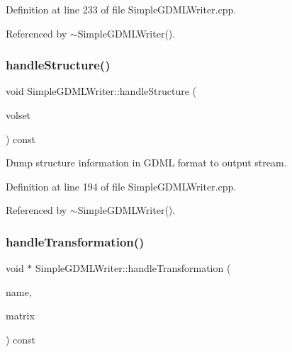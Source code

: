 Definition at line 233 of file Simple\+G\+D\+M\+L\+Writer.\+cpp.



Referenced by $\sim$\+Simple\+G\+D\+M\+L\+Writer().

\hypertarget{class_d_d4hep_1_1_geometry_1_1_simple_g_d_m_l_writer_a88417b920fda18350a8e8af662c48375}{}\label{class_d_d4hep_1_1_geometry_1_1_simple_g_d_m_l_writer_a88417b920fda18350a8e8af662c48375} 
\subsubsection{\texorpdfstring{handle\+Structure()}{handleStructure()}}
{\footnotesize\ttfamily void Simple\+G\+D\+M\+L\+Writer\+::handle\+Structure (\begin{DoxyParamCaption}\item[{const \hyperlink{class_d_d4hep_1_1_geometry_1_1_geo_handler_types_a6713619ef278692ebdf9f6ee4a3f32de}{Volume\+Vector} \&}]{volset }\end{DoxyParamCaption}) const\hspace{0.3cm}{\ttfamily [virtual]}}



Dump structure information in G\+D\+ML format to output stream. 



Definition at line 194 of file Simple\+G\+D\+M\+L\+Writer.\+cpp.



Referenced by $\sim$\+Simple\+G\+D\+M\+L\+Writer().

\hypertarget{class_d_d4hep_1_1_geometry_1_1_simple_g_d_m_l_writer_af4795983d3ea8305dee28d5f7238054a}{}\label{class_d_d4hep_1_1_geometry_1_1_simple_g_d_m_l_writer_af4795983d3ea8305dee28d5f7238054a} 
\subsubsection{\texorpdfstring{handle\+Transformation()}{handleTransformation()}}
{\footnotesize\ttfamily void $\ast$ Simple\+G\+D\+M\+L\+Writer\+::handle\+Transformation (\begin{DoxyParamCaption}\item[{const std\+::string \&}]{name,  }\item[{const T\+Geo\+Matrix $\ast$}]{matrix }\end{DoxyParamCaption}) const\hspace{0.3cm}{\ttfamily [virtual]}}



